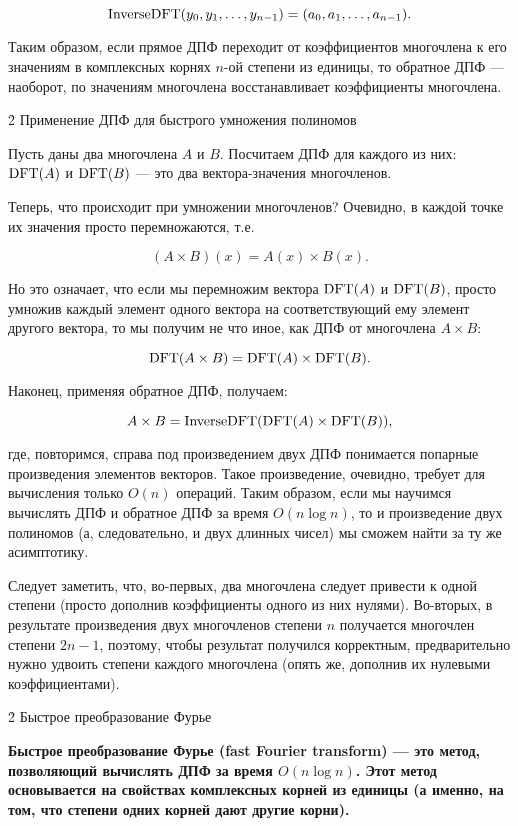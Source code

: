 $$ {\rm InverseDFT}(y_0, y_1, \ldots, y_{n-1}) = (a_0, a_1, \ldots, a_{n-1}). $$

Таким образом, если прямое ДПФ переходит от коэффициентов многочлена к его значениям в комплексных корнях $n$-ой степени из единицы, то обратное ДПФ --- наоборот, по значениям многочлена восстанавливает коэффициенты многочлена.


\h2{ Применение ДПФ для быстрого умножения полиномов }

Пусть даны два многочлена $A$ и $B$. Посчитаем ДПФ для каждого из них: ${\rm DFT}(A)$ и ${\rm DFT}(B)$ --- это два вектора-значения многочленов.

Теперь, что происходит при умножении многочленов? Очевидно, в каждой точке их значения просто перемножаются, т.е.

$$ (A \times B)(x) = A(x) \times B(x). $$

Но это означает, что если мы перемножим вектора ${\rm DFT}(A)$ и ${\rm DFT}(B)$, просто умножив каждый элемент одного вектора на соответствующий ему элемент другого вектора, то мы получим не что иное, как ДПФ от многочлена $A \times B$:

$$ {\rm DFT} (A \times B) = {\rm DFT} (A) \times {\rm DFT} (B). $$

Наконец, применяя обратное ДПФ, получаем:

$$ A \times B = {\rm InverseDFT}( {\rm DFT} (A) \times {\rm DFT} (B) ), $$

где, повторимся, справа под произведением двух ДПФ понимается попарные произведения элементов векторов. Такое произведение, очевидно, требует для вычисления только $O(n)$ операций. Таким образом, если мы научимся вычислять ДПФ и обратное ДПФ за время $O(n \log n)$, то и произведение двух полиномов (а, следовательно, и двух длинных чисел) мы сможем найти за ту же асимптотику.

Следует заметить, что, во-первых, два многочлена следует привести к одной степени (просто дополнив коэффициенты одного из них нулями). Во-вторых, в результате произведения двух многочленов степени $n$ получается многочлен степени $2n-1$, поэтому, чтобы результат получился корректным, предварительно нужно удвоить степени каждого многочлена (опять же, дополнив их нулевыми коэффициентами).


\h2{ Быстрое преобразование Фурье }

\bf{Быстрое преобразование Фурье} (fast Fourier transform) --- это метод, позволяющий вычислять ДПФ за время $O(n \log n)$. Этот метод основывается на свойствах комплексных корней из единицы (а именно, на том, что степени одних корней дают другие корни).

